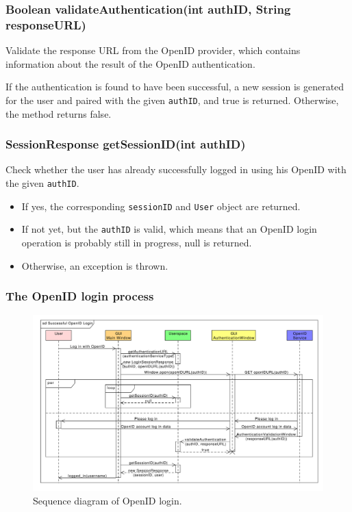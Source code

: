 \subsubsection{Boolean validateAuthentication(int authID, String responseURL)}

Validate the response URL from the OpenID provider, which contains information about the result of the OpenID authentication.

If the authentication is found to have been successful, a new session is generated for the user and paired with the given {\tt authID}, and true is returned.
Otherwise, the method returns false.

\subsubsection{SessionResponse getSessionID(int authID)}

Check whether the user has already successfully logged in using his OpenID with the given {\tt authID}.

\begin{itemize}
\item If yes, the corresponding {\tt sessionID} and {\tt User} object are returned.
\item If not yet, but the {\tt authID} is valid, which means that an OpenID login operation is probably still in progress, null is returned.
\item Otherwise, an exception is thrown.
\end{itemize}

\subsubsection{The OpenID login process}
\label{subsubsec:gui:openid}

\begin{figure}[h]
\begin{center}
\includegraphics[scale=0.55, angle=90]{figures/openid_login_sequence.pdf}
\end{center}
\caption{Sequence diagram of OpenID login.}\label{rpc:sd:openid_login}
\end{figure}

